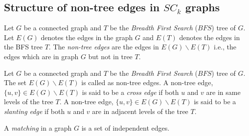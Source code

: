 \documentclass[runningheads]{llncs}
\begin{document}
\subsection{Structure of non-tree edges in $SC_k$ graphs}
\begin{definition}
Let $G$ be a connected graph and $T$ be the \emph{Breadth First Search} ($BFS$) tree of $G$. Let $E(G)$ denotes the edges in the graph $G$ and $E(T)$ denotes the edges in the BFS tree $T$. The \emph{non-tree edges} are the edges in $E(G)\backslash E(T)$ i.e., the edges which are in graph $G$ but not in tree $T$.  
\end{definition}

\begin{definition}
Let $G$ be a connected graph and $T$ be the \emph{Breadth First Search} ($BFS$) tree of $G$. The set $E(G)\backslash E(T)$ is called as non-tree edges. A non-tree edge, $\{u,v\} \in E(G)\backslash E(T)$ is said to be a \emph{cross edge} if both $u$ and $v$ are in same levels of the tree $T$. A non-tree edge, $\{u,v\} \in E(G)\backslash E(T)$ is said to be a \emph{slanting edge} if both $u$ and $v$ are in adjacent levels of the tree $T$.
\end{definition}

\begin{definition}
A \emph{matching} in a graph $G$ is a set of independent edges.
\end{definition}
\end{document}

